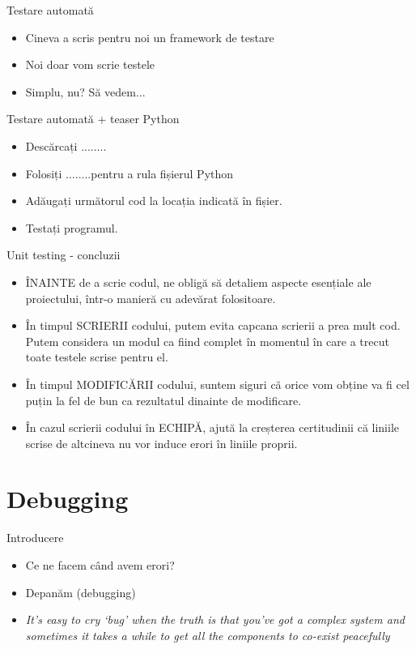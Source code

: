 \documentclass{beamer}
\begin{document}
\begin{frame}{Testare automată}
\begin{itemize}
\item Cineva a scris pentru noi un framework de testare
\item \pause Noi doar vom scrie testele
\item \pause Simplu, nu? \pause Să vedem...
\end{itemize}
\end{frame}

\begin{frame}{Testare automată + teaser Python}
\begin{itemize}
\item Descărcați ........
\item Folosiți \linebreak ........\linebreak pentru a rula fișierul Python
\item \pause Adăugați următorul cod la locația indicată în fișier.
\item Testați programul.
\end{itemize}
\end{frame}

\begin{frame}{Unit testing - concluzii}
\begin{itemize}
\item ÎNAINTE de a scrie codul, ne obligă să detaliem aspecte esențiale ale proiectului, într-o manieră cu adevărat folositoare.
\item \pause În timpul SCRIERII codului, putem evita capcana scrierii a prea mult cod. \pause Putem considera un modul ca fiind complet în momentul în care a trecut toate testele scrise pentru el.
\item \pause În timpul MODIFICĂRII codului, suntem siguri că orice vom obține va fi cel puțin la fel de bun ca rezultatul dinainte de modificare.
\item \pause În cazul scrierii codului în ECHIPĂ, ajută la creșterea certitudinii că liniile scrise de altcineva nu vor induce erori în liniile proprii.
\end{itemize}
\end{frame}

\section{Debugging}
\frame{\tableofcontents[currentsection]}

\begin{frame}{Introducere}
\begin{itemize}
\item Ce ne facem când avem erori?
\item \pause Depanăm (debugging)
\item \pause \textit{It's easy to cry `bug' when the truth is that you've got a complex system and sometimes it takes a while to get all the components to co-exist peacefully}
\end{itemize}
\end{frame}
\end{document}
